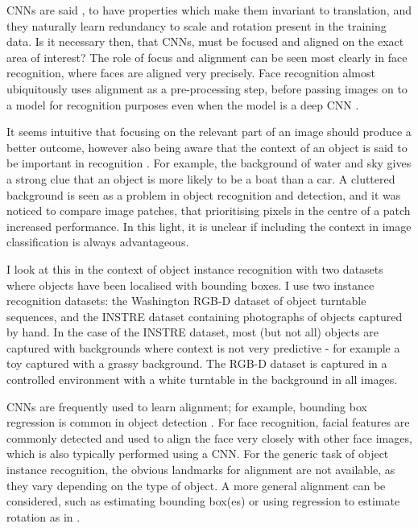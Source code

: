 \gls{CNN}s are said \cite{Krizhevsky2012}, to have properties which make them invariant to translation, and they naturally learn redundancy to scale and rotation present in the training data. Is it necessary then, that \gls{CNN}s, must be focused and aligned on the exact area of interest? The role of focus and alignment can be seen most clearly in face recognition, where faces are aligned very precisely. Face recognition almost ubiquitously uses alignment as a pre-processing step, before passing images on to a model for recognition purposes even when the model is a deep CNN \cite{Taigman2014}.

It seems intuitive that focusing on the relevant part of an image should produce a better outcome, however also being aware that the context of an object is said to be important in recognition \cite{Oliva2007}. For example, the background of water and sky gives a strong clue that an object is more likely to be a boat than a car. A cluttered background is seen as a problem in object recognition and detection, and it was noticed to compare image patches, that prioritising pixels in the centre of a patch \cite{Zagoruyko2015} increased performance. In this light, it is unclear if including the context in image classification is always advantageous. 

I look at this in the context of object instance recognition with two datasets where objects have been localised with bounding boxes. I use two instance recognition datasets: the Washington RGB-D dataset \cite{Lai2011} of object turntable sequences, and the INSTRE dataset \cite{Wang2015} containing photographs of objects captured by hand. In the case of the INSTRE dataset, most (but not all) objects are captured with backgrounds where context is not very predictive - for example a toy captured with a grassy background. The RGB-D dataset is captured in a controlled environment with a white turntable in the background in all images.

\gls{CNN}s are frequently used to learn alignment; for example, bounding box regression is common in object detection \cite{Sermanet2013}. For face recognition, facial features are commonly detected and used to align the face very closely with other face images, which is also typically performed using a CNN. For the generic task of object instance recognition, the obvious landmarks for alignment are not available, as they vary depending on the type of object. A more general alignment can be considered, such as estimating bounding box(es) or using regression to estimate rotation as in \cite {Fischer2015}. 

